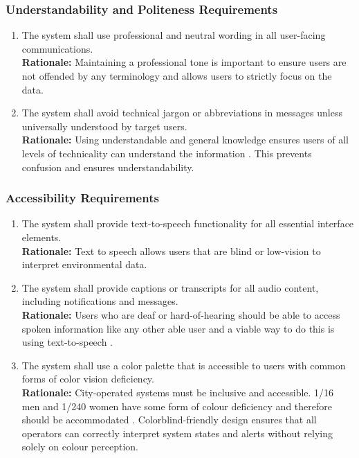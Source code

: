\documentclass[]{article}
\begin{document}
\subsubsection{Understandability and Politeness Requirements}
\label{ssub:understandability_and_politeness_requirements}
\begin{enumerate}[{UH-UP}1. ]
	\item The system shall use professional and neutral wording in all user-facing communications.\\
	\textbf{Rationale:} Maintaining a professional tone is important to ensure users are not offended by any terminology and allows users to strictly focus on the data.
	\item The system shall avoid technical jargon or abbreviations in messages unless universally understood by target users.\\
	\textbf{Rationale:} Using understandable and general knowledge ensures users of all levels of technicality can understand the information \cite{moran2023}. This prevents confusion and ensures understandability.
\end{enumerate}

\subsubsection{Accessibility Requirements}
\label{ssub:accessibility_requirements}
\begin{enumerate}[{UH-A}1. ]
	\item The system shall provide text-to-speech functionality for all essential interface elements.\\
	\textbf{Rationale:} Text to speech allows users that are blind or low-vision to interpret environmental data.
	\item The system shall provide captions or transcripts for all audio content, including notifications and messages.\\
	\textbf{Rationale:} Users who are deaf or hard-of-hearing should be able to  access spoken information like any other able user and a viable way to do this is using text-to-speech \cite{voxpow2020}.
	\item The system shall use a color palette that is accessible to users with common forms of color vision deficiency.\\
	\textbf{Rationale:} City-operated systems must be inclusive and accessible. 1/16 men and 1/240 women have some form of colour deficiency and therefore should be accommodated \cite{davidmath}. Colorblind-friendly design ensures that all operators can correctly interpret system states and alerts without relying solely on colour perception.
\end{enumerate}
\end{document}
